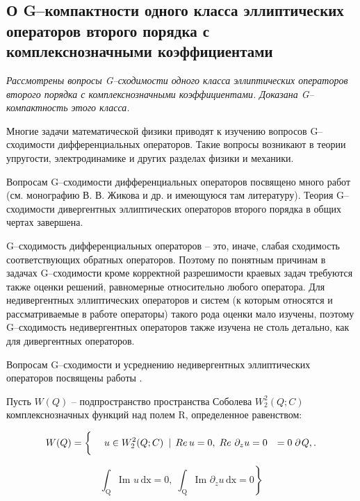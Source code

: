 \subsection{О G--компактности одного класса эллиптических операторов второго порядка с комплекснозначными коэффициентами}

\textit{
    Рассмотрены вопросы G--сходимости одного класса эллиптических операторов второго порядка с комплекснозначными коэффициентами. Доказана G--компактность этого класса.
}



Многие задачи математической физики приводят к изучению вопросов G--сходимости дифференциальных операторов. Такие вопросы возникают в теории упругости, электродинамике и других разделах физики и механики.

Вопросам G--сходимости  дифференциальных операторов посвящено много работ (см. монографию В. В. Жикова и др. \cite{JikovKozlov} и имеющуюся там литературу). Теория  G--сходимости  дивергентных эллиптических операторов второго порядка в общих чертах завершена.



G--сходимость дифференциальных операторов -- это, иначе, слабая сходимость соответствующих обратных операторов. Поэтому по понятным причинам в задачах G--сходимости кроме корректной разрешимости краевых задач требуются также оценки решений, равномерные относительно любого оператора. Для недивергентных эллиптических операторов и систем (к которым относятся и рассматриваемые в работе операторы) такого рода оценки мало изучены, поэтому G--сходимость недивергентных операторов также изучена не столь детально, как для дивергентных операторов.

Вопросам G--сходимости и усреднению недивергентных эллиптических операторов посвящены работы \cite{JikovSirazh1, JikovSirazh2, Sirazh1, Sirazh2, Sirazh3}.



Пусть $W(Q)$ -- подпространство пространства Соболева $W_{2}^{2} (Q;C)$ комплекснозначных функций над полем $\mathrm{R}$, определенное равенством:

\[W(Q)=\left\{\begin{array}{l} {} \\ {} \end{array}\right. u\in W_{2}^{2} (Q;C)\, \, \, |\; \, Re\, u=0,\; Re\, \, \partial _{z} u=0\quad \mathrm{ =0}\; \partial {\kern 1pt} Q,.    \]

\begin{equation} \label{sirM1.1_} \left. \int _{\mathrm{ Q}}\mathrm{ Im}\, \, u\, \mathrm{ dx}=\mathrm{ 0,}\; \int _{\mathrm{ Q}}\mathrm{ Im}\, \, \partial _{z} u\, \mathrm{ dx}=\mathrm{ 0}  \right\} \end{equation}

